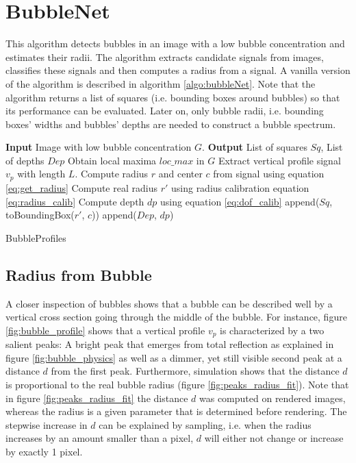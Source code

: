 		
		
		
	\section{BubbleNet}\label{BubbleNet}
	
	This algorithm detects bubbles in an image with a low bubble concentration and estimates their radii. The algorithm extracts candidate signals from images, classifies these signals and then computes a radius from a signal. A vanilla version of the algorithm is described in algorithm \ref{algo:bubbleNet}. Note that the algorithm returns a list of squares (i.e. bounding boxes around bubbles) so that its performance can be evaluated. Later on, only bubble radii, i.e. bounding boxes' widths and bubbles' depths are needed to construct a bubble spectrum. 
	
			\begin{algorithm}
			\begin{algorithmic}[1]
				\State \textbf{Input} Image with low bubble concentration $G$. 
				\State \textbf{Output} List of squares $Sq$, List of depths $Dep$
				\State Obtain local maxima $loc\_max$ in $G$
					\State Extract vertical profile signal $v_p$ with length $L$.
						\State Compute radius $r$ and center $c$ from signal using equation \ref{eq:get_radius}
						\State Compute real radius $r'$ using radius calibration equation \ref{eq:radius_calib}
						\State Compute depth $dp$ using equation \ref{eq:dof_calib}
						\State append($Sq$, toBoundingBox($r'$, $c$))
						\State append($Dep$, $dp$)
					\EndIf
				\EndFor
			\end{algorithmic}
			
			\caption{BubbleProfiles}
			\label{algo:bubbleNet}
		\end{algorithm}
	
	\subsection{Radius from Bubble}
	
	A closer inspection of bubbles shows that a bubble can be described well by a vertical cross section going through the middle of the bubble. For instance, figure \ref{fig:bubble_profile} shows that a vertical profile $v_p$ is characterized by a two salient peaks: A bright peak that emerges from total reflection as explained in figure \ref{fig:bubble_physics} as well as a dimmer, yet still visible second peak at a distance $d$ from the first peak. Furthermore, simulation shows that the distance $d$ is proportional to the real bubble radius (figure \ref{fig:peaks_radius_fit}). Note that in figure \ref{fig:peaks_radius_fit} the distance $d$ was computed on rendered images, whereas the radius is a given parameter that is determined before rendering. The stepwise increase in $d$ can be explained by sampling, i.e. when the radius increases by an amount smaller than a pixel, $d$ will either not change or increase by exactly 1 pixel.
	
